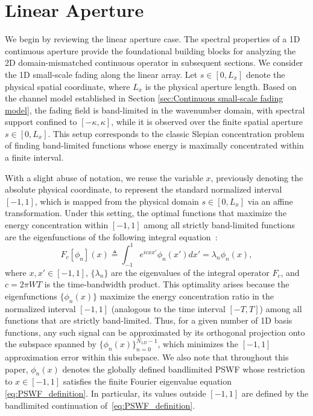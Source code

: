 \documentclass[lettersize,journal]{IEEEtran}
\theoremstyle{plain}
\begin{document}
\section{Linear Aperture}
\label{sec:linear aperture}
We begin by reviewing the linear aperture case. The spectral properties of a 1D continuous aperture provide the foundational building blocks for analyzing the 2D domain-mismatched continuous operator in subsequent sections.
We consider the 1D small-scale fading along the linear array. Let $s \in [0, L_x]$ denote the physical spatial coordinate, where $L_x$ is the physical aperture length. 
Based on the channel model established in Section \ref{sec:Continuous small-scale fading model}, the fading field is band-limited in the wavenumber domain, with spectral support confined to $[-\kappa, \kappa]$, while it is observed over the finite spatial aperture $s\in [0, L_x]$.
This setup corresponds to the classic Slepian concentration problem~\cite{Slepian1961Prolate} of finding band-limited functions whose energy is maximally concentrated within a finite interval.
	
With a slight abuse of notation, we reuse the variable $x$, previously denoting the absolute physical coordinate, to represent the standard normalized interval $[-1, 1]$, which is mapped from the physical domain $s \in [0, L_x]$ via an affine transformation. 
Under this setting, the optimal functions that maximize the energy concentration within $[-1, 1]$ among all strictly band-limited functions are the eigenfunctions of the following integral equation~\cite{Slepian1961Prolate}:
\begin{equation}
	F_c[\phi_n](x) \triangleq \int_{-1}^{1}e^{icxx'}\phi_n(x')dx' = \lambda_n \phi_n(x),
	\label{eq:PSWF_definition}
\end{equation}
where $x, x' \in [-1, 1]$, $\{\lambda_n\}$ are the eigenvalues of the integral operator $F_c$, and $c = 2\pi W T$ is the time-bandwidth product. This optimality arises because the eigenfunctions $\{\phi_n(x)\}$ maximize the energy concentration ratio in the normalized interval $[-1, 1]$ (analogous to the time interval $[-T, T]$) among all functions that are strictly band-limited. Thus, for a given number of 1D basis functions, any such signal can be approximated by its orthogonal projection onto the subspace spanned by $\{\phi_n(x)\}_{n=0}^{N_{1D}-1}$, which minimizes the $[-1, 1]$ approximation error within this subspace.
We also note that throughout this paper, $\phi_n(x)$ denotes the globally defined bandlimited PSWF whose restriction to $x \in [-1, 1]$ satisfies the finite Fourier eigenvalue equation \eqref{eq:PSWF_definition}. In particular, its values outside $[-1, 1]$ are defined by the bandlimited continuation of~\eqref{eq:PSWF_definition}.
	
\end{document}
